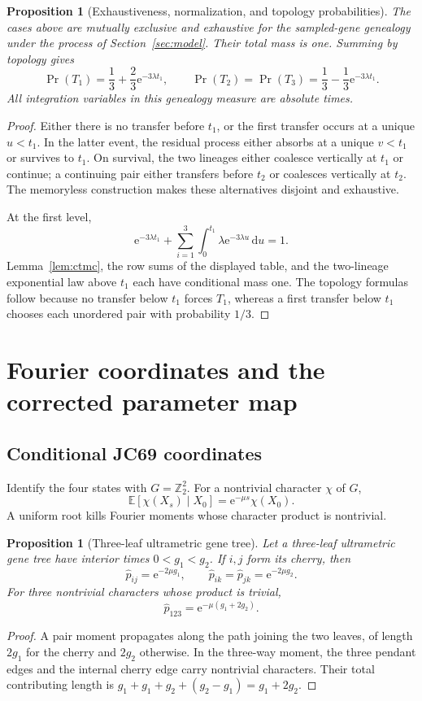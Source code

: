 \documentclass[11pt]{article}
\newtheorem{proposition}[theorem]{Proposition}
\newcommand{\e}{\mathrm e}
\newcommand{\dd}{\,\mathrm d}
\begin{document}
\begin{proposition}[Exhaustiveness, normalization, and topology probabilities]\label{prop:history}
The cases above are mutually exclusive and exhaustive for the sampled-gene genealogy under the process of Section~\ref{sec:model}.  Their total mass is one.  Summing by topology gives
\[
\Pr(T_1)=\frac13+\frac23\e^{-3\lambda t_1},
\qquad
\Pr(T_2)=\Pr(T_3)=\frac13-\frac13\e^{-3\lambda t_1}.
\]
All integration variables in this genealogy measure are absolute times.
\end{proposition}
\begin{proof}
Either there is no transfer before $t_1$, or the first transfer occurs at a unique $u<t_1$.  In the latter event, the residual process either absorbs at a unique $v<t_1$ or survives to $t_1$.  On survival, the two lineages either coalesce vertically at $t_1$ or continue; a continuing pair either transfers before $t_2$ or coalesces vertically at $t_2$.  The memoryless construction makes these alternatives disjoint and exhaustive.

At the first level,
\[
\e^{-3\lambda t_1}
+\sum_{i=1}^{3}\int_0^{t_1}\lambda\e^{-3\lambda u}\dd u=1.
\]
Lemma~\ref{lem:ctmc}, the row sums of the displayed table, and the two-lineage exponential law above $t_1$ each have conditional mass one.  The topology formulas follow because no transfer below $t_1$ forces $T_1$, whereas a first transfer below $t_1$ chooses each unordered pair with probability $1/3$.
\end{proof}

\section{Fourier coordinates and the corrected parameter map}\label{sec:map}

\subsection{Conditional JC69 coordinates}
Identify the four states with $G=\mathbb Z_2^2$.  For a nontrivial character $\chi$ of $G$,
\[
\mathbb E[\chi(X_s)\mid X_0]=\e^{-\mu s}\chi(X_0).
\]
A uniform root kills Fourier moments whose character product is nontrivial.

\begin{proposition}[Three-leaf ultrametric gene tree]\label{prop:fourier-tree}
Let a three-leaf ultrametric gene tree have interior times $0<g_1<g_2$.  If $i,j$ form its cherry, then
\[
\widehat p_{ij}=\e^{-2\mu g_1},
\qquad
\widehat p_{ik}=\widehat p_{jk}=\e^{-2\mu g_2}.
\]
For three nontrivial characters whose product is trivial,
\[
\widehat p_{123}=\e^{-\mu(g_1+2g_2)}.
\]
\end{proposition}
\begin{proof}
A pair moment propagates along the path joining the two leaves, of length $2g_1$ for the cherry and $2g_2$ otherwise.  In the three-way moment, the three pendant edges and the internal cherry edge carry nontrivial characters.  Their total contributing length is
$g_1+g_1+g_2+(g_2-g_1)=g_1+2g_2$.
\end{proof}
\end{document}

